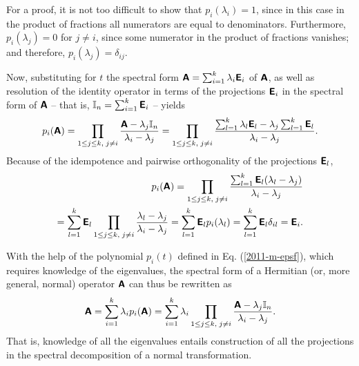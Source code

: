 {\color{OliveGreen}\bproof

For a proof, it is not too difficult
to show that
$p_i  (\lambda_i)=1$, since in this case in the product of fractions all numerators are equal to denominators.
Furthermore,
$p_i  (\lambda_j)=0$ for $j\neq i $, since some numerator in the product of fractions vanishes; and
therefore,
$p_i  (\lambda_j)=\delta_{ij}$.

Now, substituting for $t$ the spectral form $\textsf{\textbf{A}}=\sum_{i=1}^k \lambda_i\textsf{\textbf{E}}_i$
of $\textsf{\textbf{A}}$, as well as
resolution of the identity operator in terms of the projections $\textsf{\textbf{E}}_i$ in the spectral form of
$\textsf{\textbf{A}}$ -- that is, ${\Bbb I}_n=\sum_{i=1}^k \textsf{\textbf{E}}_i$ --
yields
\begin{equation}
p_i  (\textsf{\textbf{A}})
=
\prod_{
1\le j\le k,\;
j\neq i
}\frac{\textsf{\textbf{A}} - \lambda_j{\Bbb I}_n}{\lambda_i -\lambda_j}
=
\prod_{
1\le j\le k,\;
j\neq i
}\frac{\sum_{l=1}^k \lambda_l\textsf{\textbf{E}}_l - \lambda_j\sum_{l=1}^k \textsf{\textbf{E}}_l}{\lambda_i -\lambda_j}
.
\end{equation}
Because of the idempotence and pairwise orthogonality of the projections  $\textsf{\textbf{E}}_l$,
\begin{equation}
\begin{split}
p_i  (\textsf{\textbf{A}}) =
\prod_{
1\le j\le k,\;
j\neq i
}\frac{\sum_{l=1}^k \textsf{\textbf{E}}_l(\lambda_l- \lambda_j)}{\lambda_i -\lambda_j}   \\
= \sum_{l=1}^k \textsf{\textbf{E}}_l
\prod_{
1\le j\le k,\;
j\neq i
}\frac{\lambda_l- \lambda_j}{\lambda_i -\lambda_j}
= \sum_{l=1}^k \textsf{\textbf{E}}_l
p_i  (\lambda_l)
= \sum_{l=1}^k \textsf{\textbf{E}}_l
\delta_{il} = \textsf{\textbf{E}}_i.
\label{2012-m-ch-fdvs-cc}
\end{split}
\end{equation}
\eproof
}

With the help of the polynomial $p_i(t)$ defined in Eq. (\ref{2011-m-epsf}),
which requires knowledge of the eigenvalues,
the spectral form of a Hermitian (or, more general, normal) operator  $\textsf{\textbf{A}}$ can thus be rewritten as
\begin{equation}
\textsf{\textbf{A}}=\sum_{i=1}^k \lambda_i p_i(\textsf{\textbf{A}})=  \sum_{i=1}^k \lambda_i \prod_{
1\le j\le k,\;
j\neq i
}\frac{\textsf{\textbf{A}} - \lambda_j{\Bbb I}_n}{\lambda_i -\lambda_j}.
\end{equation}
That is, knowledge of all the eigenvalues entails construction
of all the projections in the spectral decomposition
of a normal transformation.


